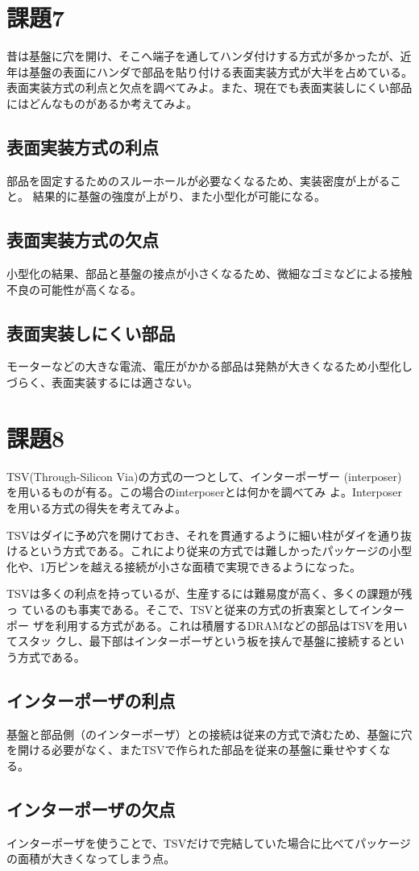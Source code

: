 \documentclass[a4j,9pt]{jsarticle}
\begin{document}
\section{課題7}
\begin{screen}
 昔は基盤に穴を開け、そこへ端子を通してハンダ付けする方式が多かったが、近
年は基盤の表面にハンダで部品を貼り付ける表面実装方式が大半を占めている。
表面実装方式の利点と欠点を調べてみよ。また、現在でも表面実装しにくい部品
にはどんなものがあるか考えてみよ。
\end{screen}
\subsection*{表面実装方式の利点}
部品を固定するためのスルーホールが必要なくなるため、実装密度が上がること。
結果的に基盤の強度が上がり、また小型化が可能になる。
\subsection*{表面実装方式の欠点}
小型化の結果、部品と基盤の接点が小さくなるため、微細なゴミなどによる接触
不良の可能性が高くなる。
\subsection*{表面実装しにくい部品}
モーターなどの大きな電流、電圧がかかる部品は発熱が大きくなるため小型化し
づらく、表面実装するには適さない。

\section{課題8}
\begin{screen}
 TSV(Through-Silicon Via)の方式の一つとして、インターポーザー
 (interposer)を用いるものが有る。この場合のinterposerとは何かを調べてみ
 よ。Interposerを用いる方式の得失を考えてみよ。
\end{screen}
TSVはダイに予め穴を開けておき、それを貫通するように細い柱がダイを通り抜
けるという方式である。これにより従来の方式では難しかったパッケージの小型
化や、1万ピンを越える接続が小さな面積で実現できるようになった。

TSVは多くの利点を持っているが、生産するには難易度が高く、多くの課題が残っ
ているのも事実である。そこで、TSVと従来の方式の折衷案としてインターポー
ザを利用する方式がある。これは積層するDRAMなどの部品はTSVを用いてスタッ
クし、最下部はインターポーザという板を挟んで基盤に接続するという方式である。

\subsection*{インターポーザの利点}
基盤と部品側（のインターポーザ）との接続は従来の方式で済むため、基盤に穴
を開ける必要がなく、またTSVで作られた部品を従来の基盤に乗せやすくなる。

\subsection*{インターポーザの欠点}
インターポーザを使うことで、TSVだけで完結していた場合に比べてパッケージ
の面積が大きくなってしまう点。
\end{document}
